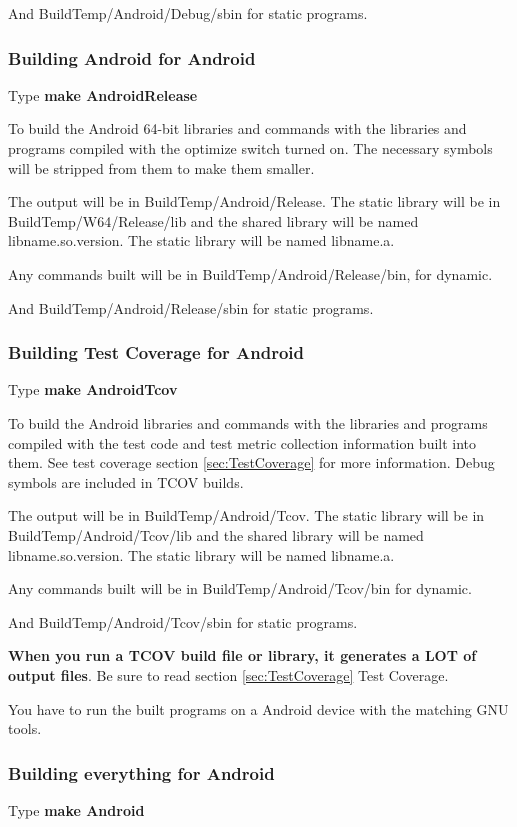 And BuildTemp/Android/Debug/sbin for static programs.

\subsubsection{Building Android for Android}
Type \textbf{make AndroidRelease}

To build the Android 64-bit libraries and commands with the libraries
and programs compiled with the optimize switch turned on.
The necessary symbols will be stripped from them to make
them smaller.

The output will be in BuildTemp/Android/Release.
The static library will be in BuildTemp/W64/Release/lib
and the shared library will be named lib{name}.so.{version}.
The static library will be named lib{name}.a.
  
Any commands built will be in BuildTemp/Android/Release/bin,
for dynamic.
  
And BuildTemp/Android/Release/sbin for static programs.
  
\subsubsection{Building Test Coverage for Android}
Type \textbf{make AndroidTcov}

To build the Android libraries and commands with the libraries
and programs compiled with the test code and test metric
collection information built into them.
See test coverage section \ref{sec:TestCoverage} for more information.
Debug symbols are included in TCOV builds.

The output will be in BuildTemp/Android/Tcov.
The static library will be in BuildTemp/Android/Tcov/lib
and the shared library will be named lib{name}.so.{version}.
The static library will be named lib{name}.a.
  
Any commands built will be in BuildTemp/Android/Tcov/bin
for dynamic.

And BuildTemp/Android/Tcov/sbin for static programs.

\textbf{When you run a TCOV build file or library, it generates a LOT of  output files}. Be sure to read section \ref{sec:TestCoverage}{ Test Coverage}.

You have to run the built programs on a Android device
with the matching GNU tools.
  
\subsubsection{Building everything for Android}
Type \textbf{make Android}

